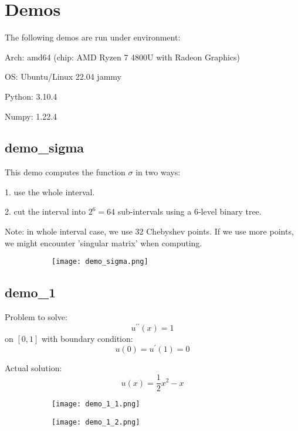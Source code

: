 \documentclass{article}
\begin{document}
\section{Demos}

The following demos are run under environment:
\bigskip

Arch: amd64 (chip: AMD Ryzen 7 4800U with Radeon Graphics)

OS: Ubuntu/Linux 22.04 jammy

Python: 3.10.4

Numpy: 1.22.4

\subsection{demo\_sigma}

This demo computes the function $\sigma$ in two ways: 

1. use the whole interval.

2. cut the interval into $2^6 = 64$ sub-intervals using a 6-level binary tree.

Note: in whole interval case, we use 32 Chebyshev points. 
If we use more points, we might encounter 'singular matrix' when computing.

\begin{figure}[H]
	\centering
    \begin{subfigure}[h]{0.8\linewidth}
	    \texttt{[image: demo\_sigma.png]}
    \end{subfigure}
\end{figure}

\subsection{demo\_1}

Problem to solve:
$$
    u^{\prime\prime}(x) = 1
$$ on $[0, 1]$
with boundary condition:
$$
    u(0) = u^\prime(1) = 0
$$

Actual solution:
$$
    u(x) = \frac12 x^2 - x
$$

\begin{figure}[H]
	\centering
	\begin{subfigure}[h]{0.45\linewidth}
	    \texttt{[image: demo\_1\_1.png]}
    \end{subfigure}
    \begin{subfigure}[h]{0.45\linewidth}
	    \texttt{[image: demo\_1\_2.png]}
    \end{subfigure}
\end{figure}
\end{document}
